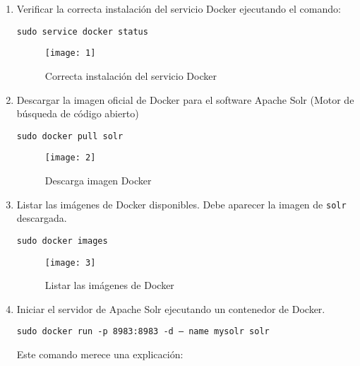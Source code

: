 \documentclass[10pt]{article}   			%
\begin{document}
\begin{enumerate}


	\item  Verificar la correcta instalación del servicio Docker ejecutando el comando: \\
	\begin{center}
		\texttt{sudo service docker status}
	\end{center}
		\begin{figure}[ht]
			\centering
			\texttt{[image: 1]}   
			\caption{Correcta instalación del servicio Docker } 
		\end{figure}
		
	\item Descargar la imagen oficial de Docker para el software Apache Solr (Motor de búsqueda de código abierto)
		\begin{center}
			\texttt{sudo docker pull solr}
		\end{center}
	
			\begin{figure}[ht]
				\centering
				\texttt{[image: 2]}   
				\caption{Descarga imagen Docker} 
			\end{figure}
	
		
	\item Listar las imágenes de Docker disponibles. Debe aparecer la imagen de \texttt{solr} descargada.\\
	
	
			\begin{center}
				\texttt{sudo docker images}
			\end{center}

			\begin{figure}[ht]
				\centering
				\texttt{[image: 3]}   
				\caption{Listar las imágenes de Docker} 
			\end{figure}
	
	\item Iniciar el servidor de Apache Solr ejecutando un contenedor de Docker.
	
				\begin{center}
					\texttt{sudo docker run -p 8983:8983 -d -- name mysolr solr}
				\end{center}
				
			 		
				
	Este comando merece una explicación:\\
	

\end{enumerate}
\end{document}
